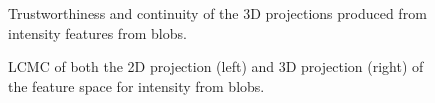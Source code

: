\begin{figure}[H]
	\centering
	\caption{Trustworthiness and continuity of the 3D projections produced from intensity features from blobs.}\label{fig:TC_3d_intensity}
\end{figure}

\begin{figure}[H]
	\centering
	\caption{LCMC of both the 2D projection (left) and 3D projection (right) of the feature space for intensity from blobs.}\label{fig:LCMC_intensity}
\end{figure}
\clearpage

